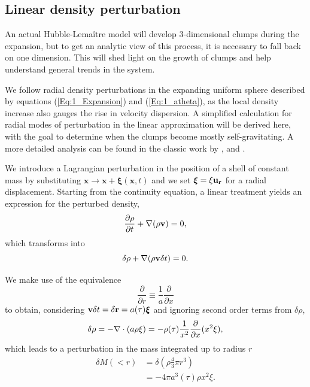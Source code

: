  
\subsection{Linear density perturbation}
\label{Sub:1_FragmentationModes}
An actual Hubble-Lema\^itre model will develop 3-dimensional clumps during the expansion, but to get an analytic view of this process, it is necessary to fall back on one dimension. This will shed light on the growth of clumps and help understand general trends in the system.

We follow radial density perturbations in the expanding uniform sphere described by equations (\ref{Eq:1_Expansion}) and (\ref{Eq:1_atheta}), as the local density increase also gauges the rise in velocity dispersion. A simplified calculation for radial modes of perturbation in the linear approximation will be derived here, with the goal to determine when the clumps become mostly self-gravitating. A more detailed analysis can be found in the classic work by \cite{Friedman1978}, \cite{Peebles1980} and \cite{Aarseth1988} .

We introduce a Lagrangian perturbation in the position of a shell of constant mass by substituting $\mathbf{x} \rightarrow \mathbf{x} + \boldsymbol\xi(\mathbf{x},t)$ and we set $\boldsymbol\xi = \xi \bold{u_r}$ for a radial displacement. Starting from the continuity equation, a linear treatment yields an expression for the perturbed density,
\begin{equation}
\frac{\partial \rho}{\partial t} + \nabla(\rho \bold{v}) = 0, 
\end{equation}
which transforms into
\begin{equation}
\delta \rho + \nabla (\rho \bold{v} \delta t) = 0.
\end{equation}

We make use of the equivalence
\begin{equation}
\label{Eq:1_derivequiv}
\frac{\partial}{\partial r} \equiv \frac{1}{a} \frac{\partial}{\partial x}
\end{equation}
to obtain, considering $ \bold{v} \delta t = \delta \bold{r} = a(\tau) \boldsymbol\xi$ and ignoring second order terms from $\delta \rho$,
\begin{equation} 
\label{Eq:1_DeltaRho} 
\delta\rho = - \mathbf{\nabla}\cdot (a\rho\mathbf{\xi}) =  - \rho(\tau) \frac{1}{x^2}\frac{\partial}{\partial x} ( x^2\xi ),
\end{equation}
which leads to a perturbation in  the mass integrated up to radius $r$ 
\begin{align}
\delta M(<r) &= \delta \left( \rho \frac{4}{3} \pi r^3 \right)\\
    &= - 4\pi a^3(\tau) \rho x^2 \xi . 
\end{align}


